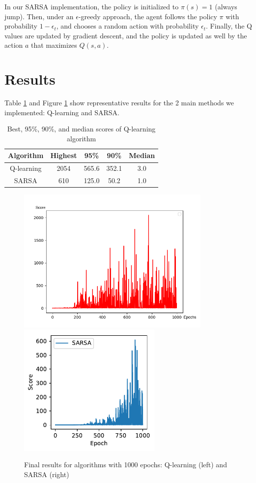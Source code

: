 \documentclass[11pt]{article}
\begin{document}
\begin{enumerate}
        In our SARSA implementation, the policy is initialized to $\pi(s) = 1$ (always jump). Then, under an $\epsilon$-greedy approach, the agent follows the policy $\pi$ with probability $1-\epsilon_t$, and chooses a random action with probability $\epsilon_t$. Finally, the Q values are updated by gradient descent, and the policy is updated as well by the action $a$ that maximizes $Q(s,a)$.
        
      \end{enumerate}


\section{Results}
Table \ref{tab:results} and Figure \ref{fig:Results} show representative results for the 2 main methods we implemented: Q-learning and SARSA.

      \begin{table}[H]
        \centering
        \begin{tabular}{ccccc}
           Algorithm & Highest & 95\% & 90\% & Median\\
           \midrule
           Q-learning & 2054 & 565.6 & 352.1 & 3.0\\
           SARSA & 610 & 125.0 & 50.2 & 1.0 \\
        \end{tabular}
        \caption{\label{tab:results} Best, 95\%, 90\%, and median scores of Q-learning algorithm}
      \end{table}
      \begin{figure}[H]
        \centering
        \includegraphics[width=9.5cm]{results.png}
        \includegraphics[width=7cm]{results_sarsa.pdf}
        \caption{Final results for algorithms with 1000 epochs: Q-learning (left) and SARSA (right)}
        \label{fig:Results}
      \end{figure}
\end{document}

